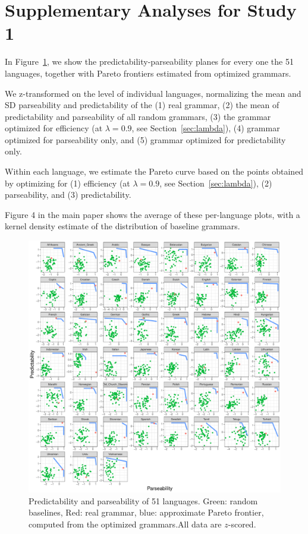 \documentclass[10pt,twoside,lineno]{article}
\begin{document}
\section{Supplementary Analyses for Study 1}


In Figure~\ref{fig:pareto-per-lang}, we show the predictability-parseability planes for every one the 51 languages, together with Pareto frontiers estimated from optimized grammars.



We z-transformed on the level of individual languages, normalizing the mean and SD parseability and predictability of the (1) real grammar, (2) the mean of predictability and parseability of all random grammars, (3) the grammar optimized for efficiency (at $\lambda =0.9$, see Section~\ref{sec:lambda}), (4) grammar optimized for parseability only, and (5) grammar optimized for predictability only.

Within each language, we estimate the Pareto curve based on the points obtained by optimizing for (1) efficiency (at $\lambda = 0.9$, see Section~\ref{sec:lambda}), (2) parseability, and (3) predictability.

Figure 4 in the main paper shows the average of these per-language plots, with a kernel density estimate of the distribution of baseline grammars. 






\begin{figure}
\centering
\includegraphics[width=\textwidth]{../results/plane/pareto-plane-perLanguage.pdf}
\caption[Predictability and Parseability]{Predictability and parseability of 51 languages. Green: random baselines, Red: real grammar, blue: approximate Pareto frontier, computed from the optimized grammars.\footnotemark All data are $z$-scored.}\label{fig:pareto-per-lang}
\end{figure}
\end{document}
